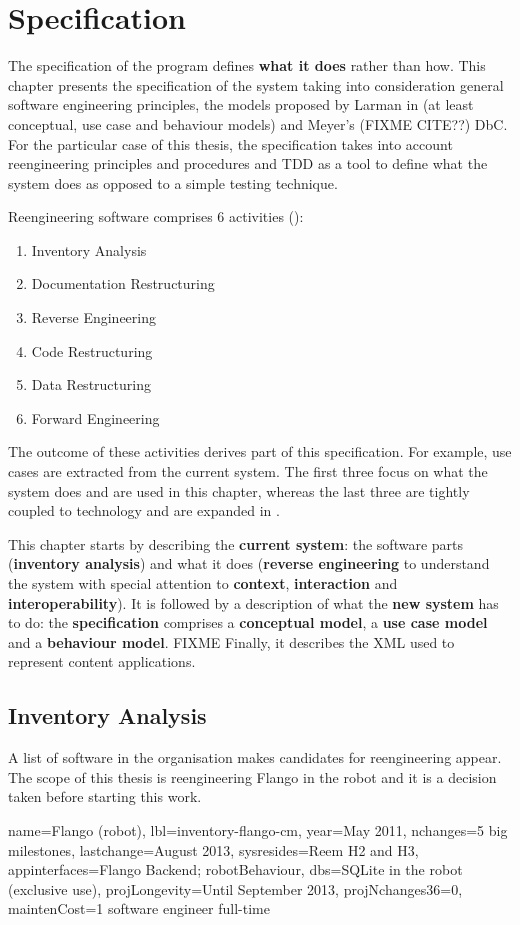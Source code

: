 \chapter{Specification}
The specification of the program defines \textbf{what it does} rather than how.
This chapter presents the specification of the system taking into consideration general software engineering principles, the models proposed by Larman  in \cite{Larman:2004} (at least conceptual, use case and behaviour models) and Meyer's (FIXME CITE??) \ac{DbC}.
For the particular case of this thesis, the specification takes into account reengineering principles and procedures and \ac{TDD} as a tool to define what the system does as opposed to a simple testing technique.

Reengineering software comprises 6 activities (): 
\begin{enumerate}
    \item Inventory Analysis
    \item Documentation Restructuring
    \item Reverse Engineering
    \item Code Restructuring
    \item Data Restructuring
    \item Forward Engineering
\end{enumerate}   
   
The outcome of these activities derives part of this specification.
For example, use cases are extracted from the current system.
The first three focus on what the system does and are used in this chapter, whereas the last three are tightly coupled to technology and are expanded in .

This chapter starts by describing the \textbf{current system}: the software parts (\textbf{inventory analysis}) and what it does (\textbf{reverse engineering} to understand the system with special attention to \textbf{context}, \textbf{interaction} and \textbf{interoperability}).
It is followed by a description of what the \textbf{new system} has to do: the \textbf{specification} comprises a \textbf{conceptual model}, a \textbf{use case model} and a \textbf{behaviour model}.
FIXME Finally, it describes the \ac{XML} used to represent content applications.

\section{Inventory Analysis}
A list of software in the organisation makes candidates for reengineering appear.
The scope of this thesis is reengineering Flango \cm in the robot and it is a decision taken before starting this work.
\begin{inventory}
{name=Flango \cm (robot),
lbl=inventory-flango-cm, 
year=May 2011,
nchanges=5 big milestones,
lastchange=August 2013,
sysresides=Reem H2 and H3,
appinterfaces=Flango Backend; robotBehaviour,
dbs=SQLite in the robot (exclusive use),
projLongevity=Until September 2013,
projNchanges36=0,
maintenCost=1 software engineer full-time
}
\end{inventory}

